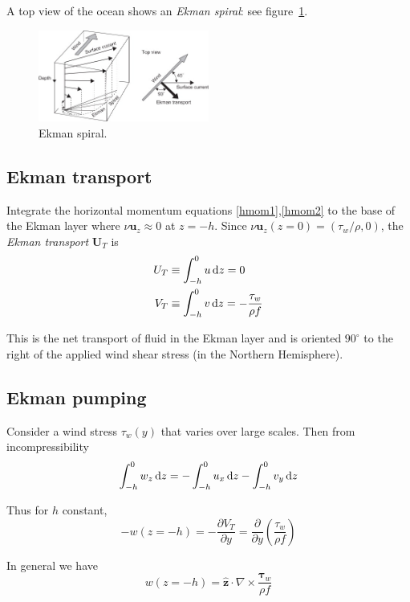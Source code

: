 \documentclass{jknotes}
\begin{document}
A top view of the ocean shows an \emph{Ekman spiral}: see
figure~\ref{fig:ekman}.
\begin{figure}
	\centering
	\includegraphics[width=0.5\textwidth]{ekman_spiral.jpg}
	\caption{Ekman spiral.}
	\label{fig:ekman}
\end{figure}

\subsection{Ekman transport}
Integrate the horizontal momentum equations \eqref{hmom1},\eqref{hmom2} to the
base of the Ekman layer where $\nu \symbf{u}_z \approx 0$ at $z=-h$. Since $\nu
\symbf{u}_z (z=0) = (\tau_w/\rho, 0)$, the \emph{Ekman transport} $\symbf{U}_T$ is
\begin{equation}
	\begin{aligned}
		U_T &\equiv \int_{-h}^0 u \, \diffd z = 0 \\
		V_T &\equiv \int_{-h}^0 v \, \diffd z = -\frac{\tau_w}{\rho f}
	\end{aligned}
\end{equation}

This is the net transport of fluid in the Ekman layer and is oriented
$90^{\circ}$ to the right of the applied wind shear stress (in the Northern
Hemisphere).

\subsection{Ekman pumping}
Consider a wind stress $\tau_w(y)$ that varies over large scales. Then from
incompressibility
\begin{equation}
	\int_{-h}^0 w_z \, \diffd z = -\int_{-h}^0 u_x \, \diffd z - \int_{-h}^0
	v_y \, \diffd z
\end{equation}

Thus for $h$ constant, 
\begin{equation}-w(z=-h) = -\frac{\partial V_T}{\partial y} =
\frac{\partial}{\partial y}\left( \frac{\tau_w}{\rho f}\right)
\end{equation}

In general we have
\begin{equation}
	w(z=-h) = \hat{\symbf{z}} \cdot \nabla \times \frac{\symbf{\tau}_w}{\rho f}
\end{equation}
\end{document}

